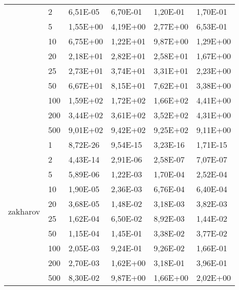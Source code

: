 \begin{longtable}[c]{|p{3.5cm}|l|l|l|l|l|}
                                        & 2         & 6,51E-05   & 6,70E-01   & 1,20E-01   & 1,70E-01  \\ \cline{2-6} 
                                        & 5         & 1,55E+00   & 4,19E+00   & 2,77E+00   & 6,53E-01  \\ \cline{2-6} 
                                        & 10        & 6,75E+00   & 1,22E+01   & 9,87E+00   & 1,29E+00  \\ \cline{2-6} 
                                        & 20        & 2,18E+01   & 2,82E+01   & 2,58E+01   & 1,67E+00  \\ \cline{2-6} 
                                        & 25        & 2,73E+01   & 3,74E+01   & 3,31E+01   & 2,23E+00  \\ \cline{2-6} 
                                        & 50        & 6,67E+01   & 8,15E+01   & 7,62E+01   & 3,38E+00  \\ \cline{2-6} 
                                        & 100       & 1,59E+02   & 1,72E+02   & 1,66E+02   & 4,41E+00  \\ \cline{2-6} 
                                        & 200       & 3,44E+02   & 3,61E+02   & 3,52E+02   & 4,31E+00  \\ \cline{2-6} 
                                        & 500       & 9,01E+02   & 9,42E+02   & 9,25E+02   & 9,11E+00  \\ \hline
\multirow[t]{10}{*}{zakharov}              & 1         & 8,72E-26   & 9,54E-15   & 3,23E-16   & 1,71E-15  \\ \cline{2-6} 
                                        & 2         & 4,43E-14   & 2,91E-06   & 2,58E-07   & 7,07E-07  \\ \cline{2-6} 
                                        & 5         & 5,89E-06   & 1,22E-03   & 1,70E-04   & 2,52E-04  \\ \cline{2-6} 
                                        & 10        & 1,90E-05   & 2,36E-03   & 6,76E-04   & 6,40E-04  \\ \cline{2-6} 
                                        & 20        & 3,68E-05   & 1,48E-02   & 3,18E-03   & 3,82E-03  \\ \cline{2-6} 
                                        & 25        & 1,62E-04   & 6,50E-02   & 8,92E-03   & 1,44E-02  \\ \cline{2-6} 
                                        & 50        & 1,15E-04   & 1,45E-01   & 3,38E-02   & 3,77E-02  \\ \cline{2-6} 
                                        & 100       & 2,05E-03   & 9,24E-01   & 9,26E-02   & 1,66E-01  \\ \cline{2-6} 
                                        & 200       & 2,70E-03   & 1,62E+00   & 3,18E-01   & 3,96E-01  \\ \cline{2-6} 
                                        & 500       & 8,30E-02   & 9,87E+00   & 1,66E+00   & 2,02E+00  \\ \hline
\end{longtable}


